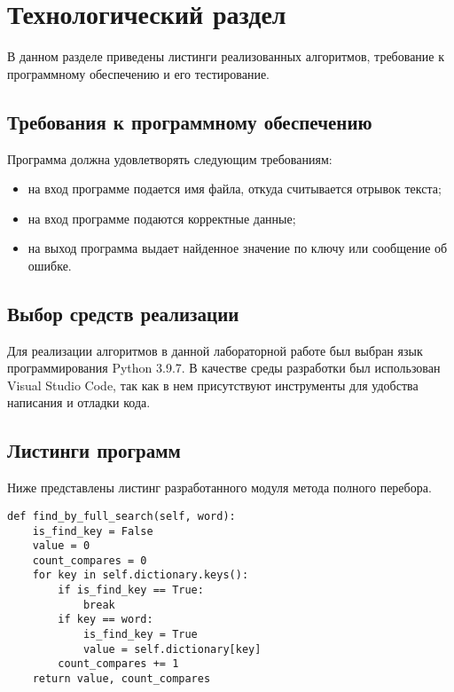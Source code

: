\chapter{Технологический раздел}
В данном разделе приведены листинги реализованных алгоритмов, требование к программному обеспечению и его тестирование.

\section{Требования к программному обеспечению}
Программа должна удовлетворять следующим требованиям:
\begin{itemize}
	\item на вход программе подается имя файла, откуда считывается отрывок текста;
	\item на вход программе подаются корректные данные;
	\item на выход программа выдает найденное значение по ключу или сообщение об ошибке.
\end{itemize}


\section{Выбор средств реализации}
Для реализации алгоритмов в данной лабораторной работе был выбран язык программирования Python 3.9.7\cite{python3}. В качестве среды разработки был использован Visual Studio Code\cite{vs}, так как в нем присутствуют инструменты для удобства написания и отладки кода.

\section{Листинги программ}
Ниже представлены листинг разработанного модуля метода полного перебора.
\newpage
\begin{lstlisting}[label = full_search, caption=Программный код алгоритма полного перебора.]
def find_by_full_search(self, word):
	is_find_key = False
	value = 0
	count_compares = 0
	for key in self.dictionary.keys():
		if is_find_key == True:
			break
		if key == word:
			is_find_key = True
			value = self.dictionary[key]
		count_compares += 1
	return value, count_compares
\end{lstlisting}

